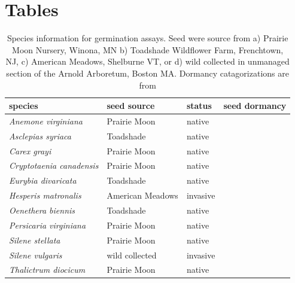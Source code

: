 \documentclass{article}\usepackage[]{graphicx}\usepackage[]{color}
\begin{document}
\section{Tables}
\begin{table}[ht]
\centering
\begin{tabular}{|l|l|l|l|}
\hline
species & seed source & status & seed dormancy \\
\hline
\textit{Anemone virginiana} & Prairie Moon & native & \\
\textit{Asclepias syriaca} & Toadshade & native & \\
\textit{Carex grayi} & Prairie Moon & native & \\
\textit{Cryptotaenia canadensis} & Prairie Moon & native & \\
\textit{Eurybia divaricata} & Toadshade & native & \\
\textit{Hesperis matronalis} & American Meadows & invasive & \\
\textit{Oenethera biennis} & Toadshade & native & \\
\textit{Persicaria virginiana} & Prairie Moon & native & \\
\textit{Silene stellata} & Prairie Moon & native & \\
\textit{Silene vulgaris} & wild collected & invasive & \\
\textit{Thalictrum diocicum} & Prairie Moon & native & \\
\hline

\end{tabular}
\caption{Species information for germination assays. Seed were source from a) Prairie Moon Nursery, Winona, MN b) Toadshade Wildflower Farm, Frenchtown, NJ, c) American Meadows, Shelburne VT, or d) wild collected in unmanaged section of the Arnold Arboretum, Boston MA. Dormancy catagorizations are from \citet{Baskin2015} }
\label{tab:specs}
\end{table}
\end{document}
